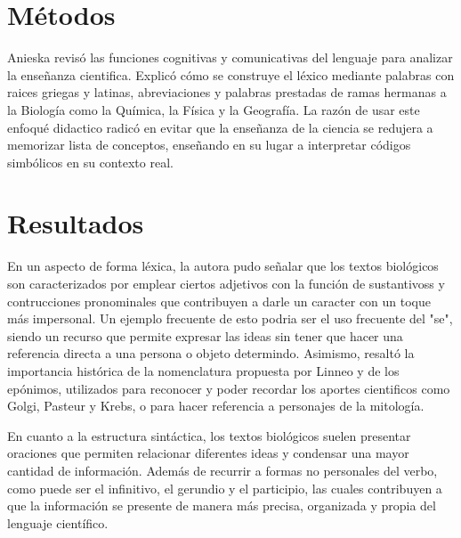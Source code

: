 \documentclass[12pt]{article}
\begin{document}
\section{Métodos}
Anieska revisó las funciones cognitivas y comunicativas del lenguaje para analizar la enseñanza cientifica. Explicó cómo se construye el léxico mediante palabras con raices griegas y latinas, abreviaciones y palabras prestadas de ramas hermanas a la Biología como la Química, la Física y la Geografía. La razón de usar este enfoqué didactico radicó en evitar que la enseñanza de la ciencia se redujera a memorizar lista de conceptos, enseñando en su lugar a interpretar códigos simbólicos en su contexto real.

\section{Resultados}
En un aspecto de forma léxica, la autora pudo señalar que los textos biológicos son caracterizados por emplear ciertos adjetivos con la función de sustantivoss y contrucciones pronominales que contribuyen a darle un caracter con un toque más impersonal. Un ejemplo frecuente de esto podria ser el uso frecuente del "se", siendo un recurso que permite expresar las ideas sin tener que hacer una referencia directa a una persona o objeto determindo. Asimismo, resaltó la importancia histórica de la nomenclatura propuesta por Linneo y de los epónimos, utilizados para reconocer y poder recordar los aportes cientificos como Golgi, Pasteur y Krebs, o para hacer referencia a personajes de la mitología.

En cuanto a la estructura sintáctica, los textos biológicos suelen presentar oraciones que permiten relacionar diferentes ideas y condensar una mayor cantidad de información. Además de recurrir a formas no personales del verbo, como puede ser el infinitivo, el gerundio y el participio, las cuales contribuyen a que la información se presente de manera más precisa, organizada y propia del lenguaje científico.
\end{document}
